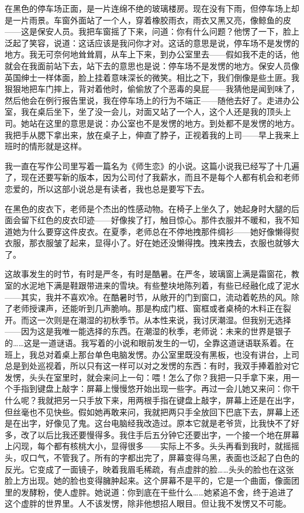 在黑色的停车场正面，是一片连绵不绝的玻璃楼房。现在没有下雨，但停车场上却是一片雨景。车窗外面站了一个人，穿着橡胶雨衣，雨衣又黑又亮，像鲸鱼的皮——这是保安人员。我把车窗摇了下来，问道：你有什么问题？他愣了一下，脸上泛起了笑容，说道：这话应该是我问你才对。这话的意思是说，停车场不是发愣的地方。我无可奈何地耸耸肩，从车上下来，到办公室里去——假如我不走的话，他就会在我面前站下去，站下去的意思也是说：停车场不是发愣的地方。保安人员像英国绅士一样体面，脸上挂着意味深长的微笑。相比之下，我们倒像是些土匪。我狠狠地把车门摔上，背对着他时，偷偷放了个恶毒的臭屁——我猜他是闻到味了，然后他会在例行报告里说，我在停车场上的行为不端正——随他去好了。走进办公室，我在桌后坐下，坐了没一会儿，对面又站了一个人，这个人还是我的顶头上司。她站在这里的意思是说：办公室也不是发愣的地方。到处都不是发愣的地方。我把手从腮下拿出来，放在桌子上，伸直了脖子，正视着我的上司——早上我来上班时的情形就是这样。 

我一直在写作公司里写着一篇名为《师生恋》的小说。这篇小说我已经写了十几遍了，现在还要写新的版本，因为公司付了我薪水，而且不是每个人都有机会和老师恋爱的，所以这部小说总是有读者，我也总是要写下去。 

在黑色的皮衣下，老师是个杰出的性感动物。在椅子上坐久了，她起身时大腿的后面会留下红色的皮衣印迹——好像挨了打，触目惊心。那件衣服并不暖和，我不知道她为什么要穿这件皮衣。在夏季，老师总在不停地拽那件绸衫——她好像懒得熨衣服，那衣服皱了起来，显得小了。好在她还没懒得拽。拽来拽去，衣服也就够大了。 

这故事发生的时节，有时是严冬，有时是酷暑。在严冬，玻璃窗上满是霜窗花，教室的水泥地下满是鞋跟带进来的雪块。有些整块地陈列着，有些已经融化成了泥水——其实，我并不喜欢冷。在酷暑时节，从敞开的门到窗口，流动着乾热的风。除了老师授课声，还能听到几声脆响。那是构成门框、窗框或者桌椅的木料正在裂开。而这一次则是在潮湿的初秋季节。从本性来说，我讨厌潮湿。但我别无选择——因为这是我唯一能选择的东西。在潮湿的秋季，老师说：未来的世界是银子的……这是一道谜语。我写着的小说和眼前发生的一切，全靠这道谜语联系着。在班上，我总对着桌上那台单色电脑发愣。办公室里既没有黑板，也没有讲台，上司总是到处巡视着，所以只有这一样可以对之发愣的东西：有时，我双手捧着脸对它发愣，头头在室里时，就会来问上一句：喂！怎么了你？我把一只手拿下来，用一个手指到键盘上敲字：屏幕上慢慢悠开始出现一些字。再过一会儿她又来问：你干什么呢？我就把另一只手放下来，用两根手指在键盘上敲字，屏幕上还是在出字，但丝毫也不见快些。假如她再敢来问，我就把两只手全放回下巴底下去，屏幕上还是在出字，好像见了鬼。这台电脑经我改造过。原本它就是老爷货，比我快不了好多，改了以后比我还要慢得多。我住手后五分钟它还要出字，一个接一个地在屏幕上闪现，每个都有核桃大小，显得很多——实际上不多。头头再看到我时，就摇摇头，叹口气，不管我了。所有的字都出完了，屏幕变得乌黑，表面也泛起了白色的反光。它变成了一面镜子，映着我眉毛稀疏，有点虚胖的脸……头头的脸也在这张脸上方出现。她的脸也变得臃肿起来。这个屏幕不是平的，它是一个曲面，像面团里的发酵粉，使人虚胖。她说道：你到底在干些什么……她紧追不舍，终于追进了这个虚胖的世界里。人不该发愣，除非他想招人眼目。但让我不发愣又不可能。 

